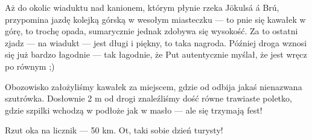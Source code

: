 Aż do okolic wiaduktu nad kanionem, którym płynie rzeka Jökulsá á Brú,  przypomina jazdę kolejką górską w wesołym miasteczku --- to pnie się kawałek w górę, to trochę opada, sumarycznie jednak zdobywa się wysokość. Za to ostatni zjadz --- na wiadukt --- jest długi i piękny, to taka nagroda. Później droga wznosi się już bardzo łagodnie --- tak łagodnie, że Put autentycznie myślał, że jest wręcz po równym ;)

Obozowisko założyliśmy kawałek za miejscem, gdzie od  odbija jakaś nienazwana szutrówka. Dosłownie 2 m od drogi znaleźliśmy dość równe trawiaste poletko, gdzie szpilki wchodzą w podłoże jak w masło --- ale się trzymają fest!

Rzut oka na licznik --- 50 km. Ot, taki sobie dzień turysty!
